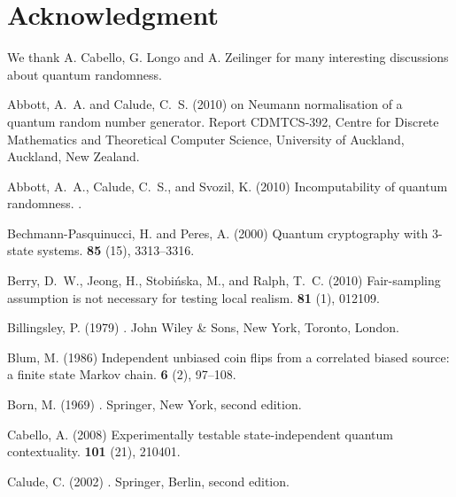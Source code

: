 \documentclass{mscs}
\begin{document}
\section*{Acknowledgment} We thank A. Cabello, G. Longo and A. Zeilinger for many interesting discussions about quantum randomness.

%
%
\begin{thebibliography}{}

Abbott, A.~A. and Calude, C.~S. (2010)
on {N}eumann normalisation of a quantum random number generator.
\newblock Report {CDMTCS}-392, Centre for Discrete Mathematics and Theoretical
  Computer Science, University of Auckland, Auckland, New Zealand.

Abbott, A.~A., Calude, C.~S., and Svozil, K. (2010)
\newblock Incomputability of quantum randomness.
.

Bechmann-Pasquinucci, H. and Peres, A. (2000)
\newblock Quantum cryptography with 3-state systems.
 {\bf 85} (15), 3313--3316.

Berry, D.~W., Jeong, H., Stobi\'{n}ska, M., and Ralph, T.~C. (2010)
\newblock Fair-sampling assumption is not necessary for testing local realism.
 {\bf 81} (1), 012109.

Billingsley, P. (1979)
.
\newblock John Wiley \& Sons, New York, Toronto, London.

Blum, M. (1986)
\newblock Independent unbiased coin flips from a correlated biased source: a
  finite state {M}arkov chain.
 {\bf 6} (2), 97--108.

Born, M. (1969)
.
\newblock Springer, New York, second edition.

Cabello, A. (2008)
\newblock Experimentally testable state-independent quantum contextuality.
 {\bf 101} (21), 210401.

Calude, C. (2002)
.
\newblock Springer, Berlin, second edition.


\end{thebibliography}
\end{document}
